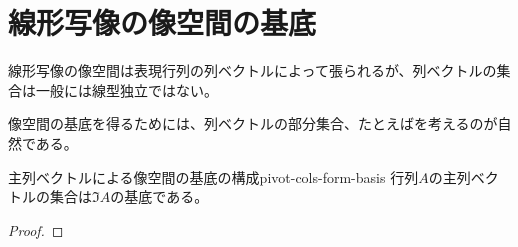 \documentclass[../../../topic_linear-algebra]{subfiles}
\begin{document}
\sectionline
\section{線形写像の像空間の基底}

線形写像の像空間は表現行列の列ベクトルによって張られるが、列ベクトルの集合は一般には線型独立ではない。

像空間の基底を得るためには、列ベクトルの部分集合、たとえばを考えるのが自然である。

\begin{theorem}{主列ベクトルによる像空間の基底の構成}{pivot-cols-form-basis}
  行列$A$の主列ベクトルの集合は$\Im A$の基底である。
\end{theorem}

\begin{proof}
\end{proof}
\end{document}
